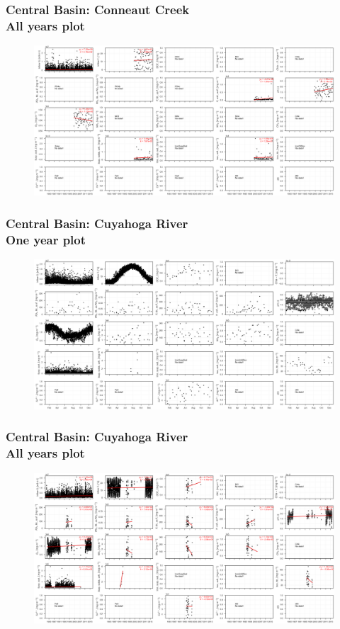 \documentclass{beamer}
\begin{document}
\begin{frame}
\frametitle{Central Basin: Conneaut Creek\\ All years plot}
\begin{figure}
\includegraphics[width=\textwidth]{rivers/Central basin/plot_all conneautcreek.png}
\end{figure}
\end{frame}

\begin{frame}
\frametitle{Central Basin: Cuyahoga River\\ One year plot}
\begin{figure}
\includegraphics[width=\textwidth]{rivers/Central basin/plot_1yr cuyahogariver.png}
\end{figure}
\end{frame}

\begin{frame}
\frametitle{Central Basin: Cuyahoga River\\ All years plot}
\begin{figure}
\includegraphics[width=\textwidth]{rivers/Central basin/plot_all cuyahogariver.png}
\end{figure}
\end{frame}
\end{document}
